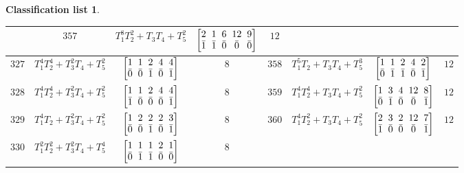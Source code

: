 \documentclass[pdftex]{sigma}%
\theoremstyle{definition}
\newtheorem{class-list}[thm]{Classification list}
\numberwithin{equation}{section}
\begin{document}
\begin{class-list}
\begin{table}[h!]
\begin{tabu}{c|c|c|c||c|c|c|c}
&${357}$&${T_{1}^{8}T_{2}^{2}+T_{3}T_{4}+T_{5}^{2}}$
&$\arraycolsep=1mm\begin{bmatrix}{2} & {1} & {6} & {12} & {9} \\ {\bar{1}} & {\bar{1}} & {\bar{0}} & {\bar{0}} & {\bar{0}}\end{bmatrix}$&${12}$
\\
\hline
${327}$&${T_{1}^{4}T_{2}^{4}+T_{3}^{2}T_{4}+T_{5}^{2}}$
&$\arraycolsep=1mm\begin{bmatrix}{1} & {1} & {2} & {4} & {4} \\ {\bar{0}} & {\bar{0}} & {\bar{1}} & {\bar{0}} & {\bar{1}}\end{bmatrix}$&${8}$
&${358}$&${T_{1}^{5}T_{2}+T_{3}T_{4}+T_{5}^{3}}$
&$\arraycolsep=1mm\begin{bmatrix}{1} & {1} & {2} & {4} & {2} \\ {\bar{0}} & {\bar{1}} & {\bar{1}} & {\bar{0}} & {\bar{1}}\end{bmatrix}$&${12}$
\\
\hline
${328}$&${T_{1}^{4}T_{2}^{4}+T_{3}^{2}T_{4}+T_{5}^{2}}$
&$\arraycolsep=1mm\begin{bmatrix}{1} & {1} & {2} & {4} & {4} \\ {\bar{1}} & {\bar{0}} & {\bar{0}} & {\bar{0}} & {\bar{1}}\end{bmatrix}$&${8}$
&${359}$&${T_{1}^{4}T_{2}^{4}+T_{3}T_{4}+T_{5}^{2}}$
&$\arraycolsep=1mm\begin{bmatrix}{1} & {3} & {4} & {12} & {8} \\ {\bar{0}} & {\bar{1}} & {\bar{0}} & {\bar{0}} & {\bar{1}}\end{bmatrix}$&${12}$
\\
\hline
${329}$&${T_{1}^{4}T_{2}+T_{3}^{2}T_{4}+T_{5}^{2}}$
&$\arraycolsep=1mm\begin{bmatrix}{1} & {2} & {2} & {2} & {3} \\ {\bar{0}} & {\bar{0}} & {\bar{1}} & {\bar{0}} & {\bar{1}}\end{bmatrix}$&${8}$
&${360}$&${T_{1}^{4}T_{2}^{2}+T_{3}T_{4}+T_{5}^{2}}$
&$\arraycolsep=1mm\begin{bmatrix}{2} & {3} & {2} & {12} & {7} \\ {\bar{1}} & {\bar{0}} & {\bar{0}} & {\bar{0}} & {\bar{1}}\end{bmatrix}$&${12}$
\\
\hline
${330}$&${T_{1}^{2}T_{2}^{2}+T_{3}^{2}T_{4}+T_{5}^{4}}$
&$\arraycolsep=1mm\begin{bmatrix}{1} & {1} & {1} & {2} & {1} \\ {\bar{0}} & {\bar{1}} & {\bar{1}} & {\bar{0}} & {\bar{0}}\end{bmatrix}$&${8}$

\end{tabu}
\end{table}
\end{class-list}
\end{document}
